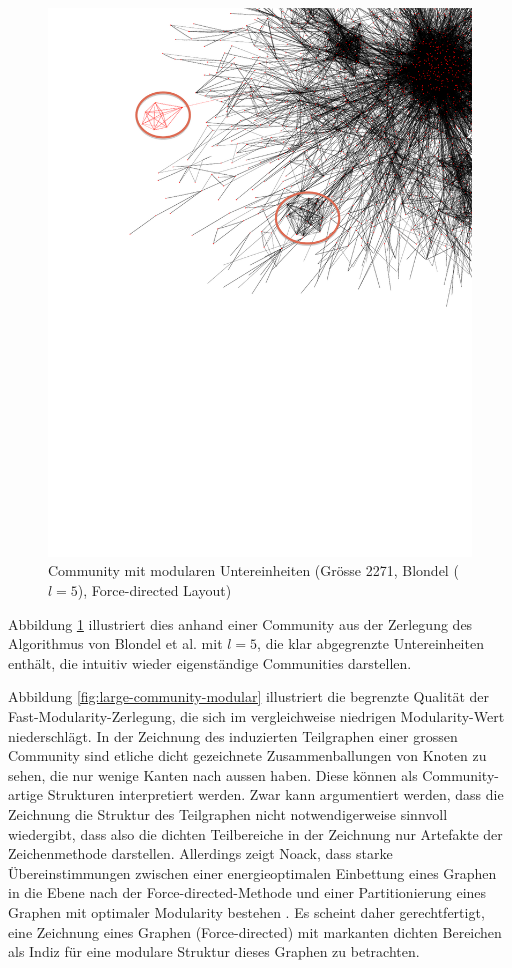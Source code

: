 \begin{figure}[ht]
  \centering
  \includegraphics[scale=0.7]{images/blondel-l5-com-c3a5eaab680984b123037897b0be74bf-edit.pdf}
  \caption{Community mit modularen Untereinheiten (Gr\"osse 2271,
    Blondel ($l=5$), Force-directed Layout)}
  \label{fig:large-modular}
\end{figure}

Abbildung \ref{fig:large-modular} illustriert dies anhand einer
Community aus der Zerlegung des Algorithmus von Blondel et al. mit
$l=5$, die klar abgegrenzte Untereinheiten enth\"alt, die intuitiv
wieder eigenst\"andige Communities darstellen.


Abbildung \ref{fig:large-community-modular} illustriert die begrenzte
Qualit\"at der Fast-Modularity-Zerlegung, die sich im vergleichweise
niedrigen Modularity-Wert niederschl\"agt. In der Zeichnung des
induzierten Teilgraphen einer grossen Community sind etliche dicht
gezeichnete Zusammenballungen von Knoten zu sehen, die nur wenige
Kanten nach aussen haben. Diese k\"onnen als Community-artige
Strukturen interpretiert werden. Zwar kann argumentiert werden, dass
die Zeichnung die Struktur des Teilgraphen nicht notwendigerweise
sinnvoll wiedergibt, dass also die dichten Teilbereiche in der
Zeichnung nur Artefakte der Zeichenmethode darstellen. Allerdings
zeigt Noack, dass starke \"Ubereinstimmungen zwischen einer
energieoptimalen Einbettung eines Graphen in die Ebene nach der
Force-directed-Methode und einer Partitionierung eines Graphen mit
optimaler Modularity bestehen \cite{Noack2009}. Es scheint daher
gerechtfertigt, eine Zeichnung eines Graphen (Force-directed) mit
markanten dichten Bereichen als Indiz f\"ur eine modulare Struktur
dieses Graphen zu betrachten.


